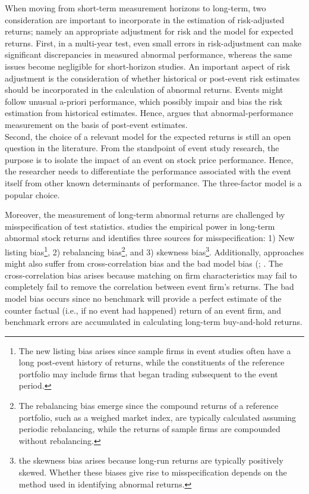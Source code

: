 When moving from short-term measurement horizons to long-term, two consideration are important to incorporate in the estimation of risk-adjusted returns; namely an appropriate adjustment for risk and the model for expected returns. First, in a multi-year test, even small errors in risk-adjustment can make significant discrepancies in measured abnormal performance, whereas the same issues become negligible for short-horizon studies. An important aspect of risk adjustment is the consideration of whether historical or post-event risk estimates should be incorporated in the calculation of abnormal returns. Events might follow unusual a-priori performance, which possibly impair and bias the risk estimation from historical estimates. Hence, \cite{kothari} argues that abnormal-performance measurement on the basis of post-event estimates. \\
Second, the choice of a relevant model for the expected returns is still an open question in the literature. From the standpoint of event study research, the purpose is to isolate the impact of an event on stock price performance. Hence, the researcher needs to differentiate the performance associated with the event itself from other known determinants of performance. The \cite{Fama_french_3fac} three-factor model is a popular choice. 


Moreover, the measurement of long-term abnormal returns are challenged by misspecification of test statistics. \cite{Lyon_1997_test_stats} studies the empirical power in long-term abnormal stock returns and identifies three sources for misspecification: 1) New listing bias\footnote{The new listing bias arises since sample firms in event studies often have a long post-event history of returns, while the constituents of the reference portfolio may include firms that began trading subsequent to the event period.}, 2) rebalancing bias\footnote{The rebalancing bias emerge since the compound returns of a reference portfolio, such as a weighed market index, are typically calculated assuming periodic rebalancing, while the returns of sample firms are compounded without rebalancing. }, and 3) skewness bias\footnote{ the skewness bias arises because long-run returns are typically positively skewed. Whether these biases give rise to misspecification depends on the method used in identifying abnormal returns.}. Additionally, approaches might also suffer from cross-correlation bias and the bad model bias (\citep{fama1998_events}; \citep{mitchell2000managerial}. The cross-correlation bias arises because matching on firm characteristics may fail to completely fail to remove the correlation between event firm's returns. The bad model bias occurs since no benchmark will provide a perfect estimate of the counter factual (i.e., if no event had happened) return of an event firm, and benchmark errors are accumulated in calculating long-term buy-and-hold returns. 

